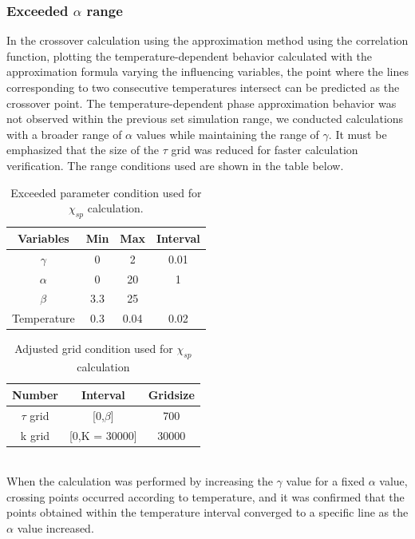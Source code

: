 \documentclass{article}[12pt]
\begin{document}
\begin{spacing}{1.3}
\subsubsection*{Exceeded $\alpha$ range}
In the crossover calculation using the approximation method using the correlation function, 
plotting the temperature-dependent behavior calculated with the approximation formula varying the influencing variables, 
the point where the lines corresponding to two consecutive temperatures intersect can be predicted as the crossover point.
The temperature-dependent phase approximation behavior was not observed within the previous set simulation range, 
we conducted calculations with a broader range of $\alpha$ values while maintaining the range of $\gamma$. 
It must be emphasized that the size of the $\tau$ grid was reduced for faster calculation verification. 
The range conditions used are shown in the table below.
\begin{table}[htbp]
  \centering
  \renewcommand{\arraystretch}{1.2}  %
  \begin{tabular}{@{}cccc@{}}
  \toprule
  \textbf{Variables} & \textbf{Min} & \textbf{Max}  & \textbf{Interval}\\ 
  \midrule
  $\gamma$ & 0 & 2 & 0.01 \\
  $\alpha$ & 0 & 20 & 1 \\
  $\beta$ & 3.3 & 25 &  \\
  Temperature & 0.3 & 0.04 & 0.02 \\
  \bottomrule
  \end{tabular}
  \caption{Exceeded parameter condition used for $\chi_{sp}$ calculation.}
  \end{table}
\begin{table}[htbp]
  \centering
  \renewcommand{\arraystretch}{1.2}  %
  \begin{tabular}{@{}ccc@{}}
  \toprule
  \textbf{Number} & \textbf{Interval} & \textbf{Gridsize}\\ 
  \midrule
  $\tau$ grid & [0,$\beta$] & 700 \\
  k grid & [0,K = 30000] & 30000 \\
  \bottomrule
  \end{tabular}
  \caption{Adjusted grid condition used for $\chi_{sp}$ calculation}
  \end{table}
\\
When the calculation was performed by increasing the $\gamma$ value for a fixed $\alpha$ value, crossing points occurred according to temperature, 
and it was confirmed that the points obtained within the temperature interval converged to a specific line as the $\alpha$ value increased. 

\end{spacing}
\end{document}

